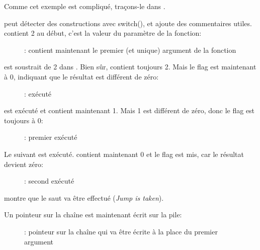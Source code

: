 ﻿\clearpage
\mysubparagraph{\olly}

Comme cet exemple est compliqué, traçons-le dans \olly.

\olly peut détecter des constructions avec switch(), et ajoute des commentaires utiles.
\EAX contient 2 au début, c'est la valeur du paramètre de la fonction:

\begin{figure}[H]
\centering
{}
\caption{\olly: \EAX 
contient maintenant le premier (et unique) argument de la fonction}
\label{fig:switch_few_olly1}
\end{figure}

 est soustrait de 2 dans \EAX.
Bien sûr, \EAX contient toujours 2.
Mais le flag \ZF est maintenant à 0, indiquant que le résultat est différent de
zéro:

\begin{figure}[H]
\centering
{}
\caption{\olly: \SUB exécuté}
\label{fig:switch_few_olly2}
\end{figure}

\clearpage
\DEC est exécuté et \EAX contient maintenant 1.
Mais 1 est différent de zéro, donc le flag \ZF est toujours à 0:

\begin{figure}[H]
\centering
{}
\caption{\olly: premier \DEC exécuté}
\label{fig:switch_few_olly3}
\end{figure}

\clearpage
Le \DEC suivant est exécuté.
\EAX contient maintenant 0 et le flag \ZF est mis, car le résultat devient zéro:

\begin{figure}[H]
\centering
{}
\caption{\olly: second \DEC exécuté}
\label{fig:switch_few_olly4}
\end{figure}

\olly montre que le saut va être effectué (\emph{Jump is taken}).

\clearpage
Un pointeur sur la chaîne  est maintenant écrit sur la pile:

\begin{figure}[H]
\centering
{}
\caption{\olly: 
pointeur sur la chaîne qui va être écrite à la place du premier argument}
\label{fig:switch_few_olly5}
\end{figure}

